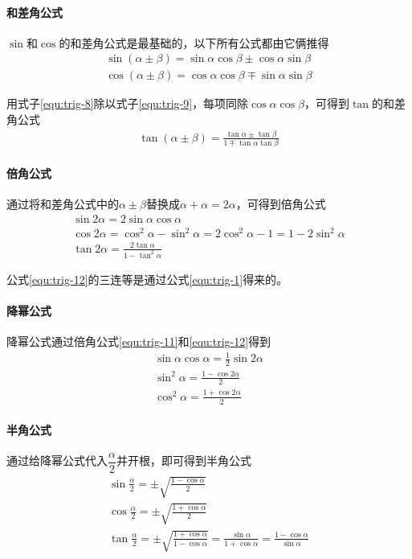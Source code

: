 \paragraph{和差角公式}
$\sin$和$\cos$的和差角公式是最基础的，以下所有公式都由它俩推得
\begin{gather}
	\sin(\alpha\pm\beta)=\sin\alpha\cos\beta\pm\cos\alpha\sin\beta \label{equ:trig-8} \\
	\cos(\alpha\pm\beta)=\cos\alpha\cos\beta\mp\sin\alpha\sin\beta \label{equ:trig-9}
\end{gather}

用式子\eqref{equ:trig-8}除以式子\eqref{equ:trig-9}，每项同除$\cos\alpha\cos\beta$，可得到$\tan$的和差角公式
\begin{gather}
	\tan(\alpha\pm\beta)=\frac{\tan\alpha\pm\tan\beta}{1\mp\tan\alpha\tan\beta} \label{equ:trig-10}
\end{gather}

\paragraph{倍角公式}
通过将和差角公式中的$\alpha\pm\beta$替换成$\alpha+\alpha=2\alpha$，可得到倍角公式
\begin{gather}
    \sin2\alpha=2\sin\alpha\cos\alpha \label{equ:trig-11} \\
    \cos2\alpha=\cos^2\alpha-\sin^2\alpha=2\cos^2\alpha-1=1-2\sin^2\alpha \label{equ:trig-12} \\
    \tan2\alpha=\frac{2\tan\alpha}{1-\tan^2\alpha} \label{equ:trig-13}
\end{gather}

公式\eqref{equ:trig-12}的三连等是通过公式\eqref{equ:trig-1}得来的。

\paragraph{降幂公式}
降幂公式通过倍角公式\eqref{equ:trig-11}和\eqref{equ:trig-12}得到
\begin{gather}
    \sin\alpha\cos\alpha=\frac{1}{2}\sin2\alpha \label{equ:trig-14} \\
    \sin^2\alpha=\frac{1-\cos2\alpha}{2} \label{equ:trig-15} \\
    \cos^2\alpha=\frac{1+\cos2\alpha}{2} \label{equ:trig-16}
\end{gather}

\paragraph{半角公式}
通过给降幂公式代入$\dfrac{\alpha}{2}$并开根，即可得到半角公式
\begin{gather}
    \sin\frac{\alpha}{2}=\pm\sqrt{\frac{1-\cos\alpha}{2}} \label{equ:trig-17} \\
    \cos\frac{\alpha}{2}=\pm\sqrt{\frac{1+\cos\alpha}{2}} \label{equ:trig-18} \\
    \tan\frac{\alpha}{2}=\pm\sqrt{\frac{1+\cos\alpha}{1-\cos\alpha}}=\frac{\sin\alpha}{1+\cos\alpha}=\frac{1-\cos\alpha}{\sin\alpha} \label{equ:trig-19}
\end{gather}

